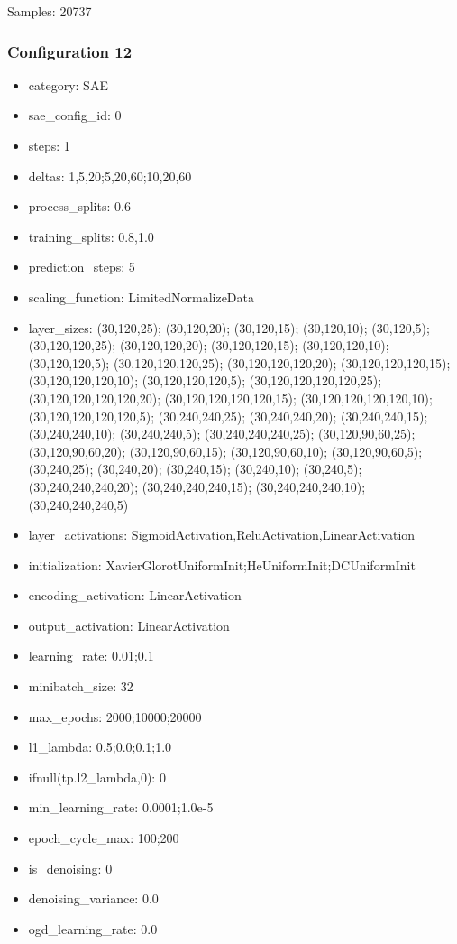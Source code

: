 \documentclass[a4paper,11pt,oneside]{article}
\theoremstyle{plain}
\theoremstyle{definition}
\begin{document}
	Samples: 20737
	
	\subsubsection{Configuration 12}\label{config12}
	\begin{itemize}
		\item category: SAE
		\item sae\_config\_id: 0
		\item steps: 1
		\item deltas: 1,5,20;5,20,60;10,20,60
		\item process\_splits: 0.6
		\item training\_splits: 0.8,1.0
		\item prediction\_steps: 5
		\item scaling\_function: LimitedNormalizeData
		\item layer\_sizes: (30,120,25); (30,120,20); (30,120,15); (30,120,10); (30,120,5); (30,120,120,25); (30,120,120,20); (30,120,120,15); (30,120,120,10); (30,120,120,5); (30,120,120,120,25); (30,120,120,120,20); (30,120,120,120,15); (30,120,120,120,10); (30,120,120,120,5); (30,120,120,120,120,25); (30,120,120,120,120,20); (30,120,120,120,120,15); (30,120,120,120,120,10); (30,120,120,120,120,5); (30,240,240,25); (30,240,240,20); (30,240,240,15); (30,240,240,10); (30,240,240,5); (30,240,240,240,25); (30,120,90,60,25); (30,120,90,60,20); (30,120,90,60,15); (30,120,90,60,10); (30,120,90,60,5); (30,240,25); (30,240,20); (30,240,15); (30,240,10); (30,240,5); (30,240,240,240,20); (30,240,240,240,15); (30,240,240,240,10); (30,240,240,240,5)
		\item layer\_activations: SigmoidActivation,ReluActivation,LinearActivation
		\item initialization: XavierGlorotUniformInit;HeUniformInit;DCUniformInit
		\item encoding\_activation: LinearActivation
		\item output\_activation: LinearActivation
		\item learning\_rate: 0.01;0.1
		\item minibatch\_size: 32
		\item max\_epochs: 2000;10000;20000
		\item l1\_lambda: 0.5;0.0;0.1;1.0
		\item ifnull(tp.l2\_lambda,0): 0
		\item min\_learning\_rate: 0.0001;1.0e-5
		\item epoch\_cycle\_max: 100;200
		\item is\_denoising: 0
		\item denoising\_variance: 0.0
		\item ogd\_learning\_rate: 0.0
	\end{itemize}
	
\end{document}
